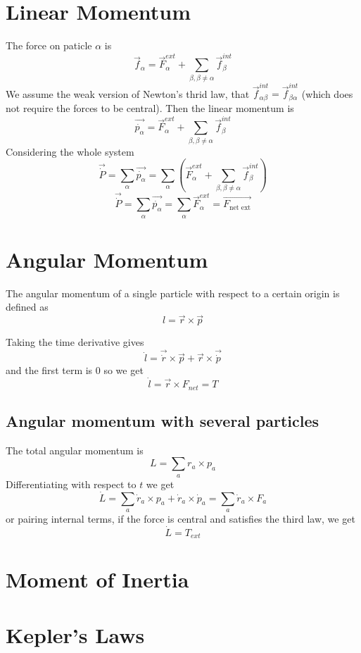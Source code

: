 \documentclass{homework}
\begin{document}
\section{Linear Momentum}

The force on paticle $\alpha$ is 
\[\vec{f}_{\alpha} = \vec{F}_{\alpha}^{ext} + \sum_{\beta, \beta \neq \alpha}\vec{f}_{\beta}^{int}\]
We assume the weak version of Newton's thrid law, that $\vec{f}_{\alpha\beta}^{int} = \vec{f}_{\beta\alpha}^{int}$ (which does not require the forces to be central). Then the linear momentum is
\[\vec{\dot{p_{\alpha}}} = \vec{F}_{\alpha}^{ext} + \sum_{\beta, \beta \neq \alpha}\vec{f}_{\beta}^{int}\]
Considering the whole system
\[\vec{\dot{P}} = \sum_{\alpha} \vec{\dot{p_{\alpha}}} = \sum_{\alpha}(\vec{F}_{\alpha}^{ext} + \sum_{\beta, \beta \neq \alpha}\vec{f}_{\beta}^{int})\]
\[\vec{\dot{P}} = \sum_{\alpha} \vec{\dot{p_{\alpha}}} = \sum_{\alpha}\vec{F}_{\alpha}^{ext} = \vec{F_{\text{net ext}} }\]

\section{Angular Momentum}

The angular momentum of a single particle with respect to a certain origin is defined as 
\[l = \vec{r} \times \vec{p}\]

Taking the  time derivative gives
\[\dot{l} = \vec{\dot{r}} \times \vec{p} + \vec{r} \times \vec{\dot{p}}\]
and the first term is $0$ so we get
\[\dot{l} = \vec{r} \times F_{net} = T\]

\subsection{Angular momentum with several particles}

The total angular momentum is 
\[L = \sum_{a}r_a \times p_a\]
Differentiating with respect to $t$ we get
\[\dot{L} = \sum_{a}\dot{r}_a \times p_a + \dot{r}_a \times \dot{p}_a = \sum_{a}\dot{r}_a \times F_a\]
or pairing internal terms, if the force is central and satisfies the third law, we get
\[\dot{L} = T_{ext}\]


\section{Moment of Inertia}



\section{Kepler's Laws}
\end{document}
